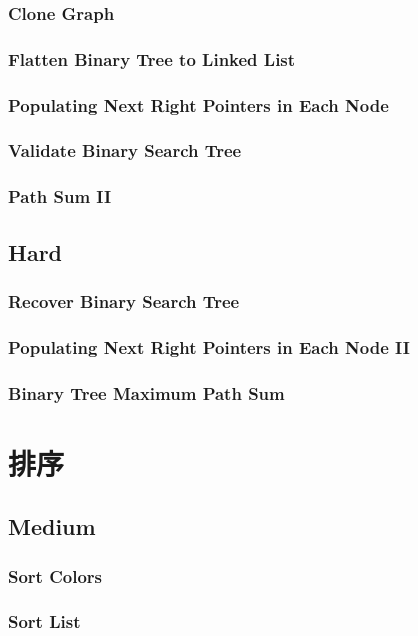 \documentclass[12pt]{book}
\begin{document}
\subsection{Clone Graph}
\label{sec-8-2-6}
\subsection{Flatten Binary Tree to Linked List}
\label{sec-8-2-7}
\subsection{Populating Next Right Pointers in Each Node}
\label{sec-8-2-8}
\subsection{Validate Binary Search Tree}
\label{sec-8-2-9}
\subsection{Path Sum II}
\label{sec-8-2-10}
\section{Hard}
\label{sec-8-3}
\subsection{Recover Binary Search Tree}
\label{sec-8-3-1}
\subsection{Populating Next Right Pointers in Each Node II}
\label{sec-8-3-2}
\subsection{Binary Tree Maximum Path Sum}
\label{sec-8-3-3}
\chapter{排序}
\label{sec-9}
\section{Medium}
\label{sec-9-1}
\subsection{Sort Colors}
\label{sec-9-1-1}
\subsection{Sort List}
\label{sec-9-1-2}
\end{document}
